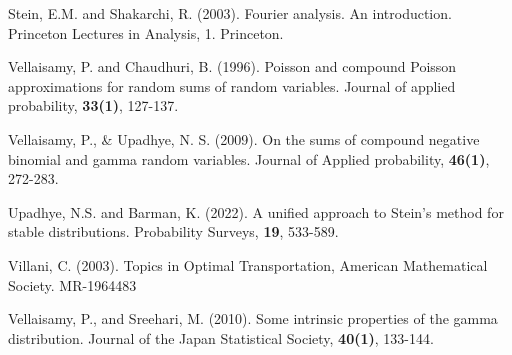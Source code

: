 \documentclass[12pt, a4paper,reqno]{amsart}
\theoremstyle{definition}
\theoremstyle{myremark}
\numberwithin{equation}{section}
\begin{document}
\begin{thebibliography}{}
	 Stein, E.M. and Shakarchi, R. (2003). Fourier analysis. An introduction. Princeton Lectures in Analysis, 1. Princeton.
	
	
	
	 Vellaisamy, P. and Chaudhuri, B. (1996). Poisson and compound Poisson approximations for random sums of random variables. Journal of applied probability, {\bf 33(1)}, 127-137.
	
	Vellaisamy, P., \& Upadhye, N. S. (2009). On the sums of compound negative binomial and gamma random variables. Journal of Applied probability, \textbf{46(1)}, 272-283.
	
	Upadhye, N.S. and Barman, K. (2022). A unified approach to Stein's method for stable distributions. Probability Surveys, \textbf{19}, 533-589.
	
	
	 Villani, C. (2003). Topics in Optimal Transportation, American Mathematical Society. MR-1964483
	
	
	
	
	
	
	
	
	
	
	 Vellaisamy, P., and Sreehari, M. (2010). Some intrinsic properties of the gamma distribution. Journal of the Japan Statistical Society, \textbf{40(1)}, 133-144.
	
	
	
	
	
	
	
	
	
	
	
	
\end{thebibliography}
\end{document}
